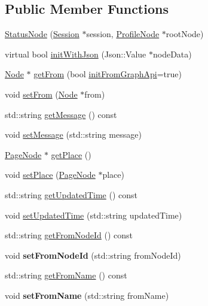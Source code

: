 \subsection*{Public Member Functions}
\begin{DoxyCompactItemize}
\item 
\hyperlink{classfl4cpp_1_1_status_node_ad0f19449b0dd5a4bf533f37b381cf540}{Status\+Node} (\hyperlink{classfl4cpp_1_1_session}{Session} $\ast$session, \hyperlink{classfl4cpp_1_1_profile_node}{Profile\+Node} $\ast$root\+Node)
\item 
virtual bool \hyperlink{classfl4cpp_1_1_status_node_aa99586c53782cfedd1f7d21e3508c20c}{init\+With\+Json} (Json\+::\+Value $\ast$node\+Data)
\item 
\hyperlink{classfl4cpp_1_1_node}{Node} $\ast$ \hyperlink{classfl4cpp_1_1_status_node_a5e7f1125af1dac536e4261e39c499171}{get\+From} (bool \hyperlink{classfl4cpp_1_1_node_a1dd4594ffd7eb08e9e8c5031d2109a59}{init\+From\+Graph\+Api}=true)
\item 
void \hyperlink{classfl4cpp_1_1_status_node_ae86c8eba3295e0dcd460310ff73f44e7}{set\+From} (\hyperlink{classfl4cpp_1_1_node}{Node} $\ast$from)
\item 
std\+::string \hyperlink{classfl4cpp_1_1_status_node_aac8ebbdf9a59455bacc180946ad25e06}{get\+Message} () const 
\item 
void \hyperlink{classfl4cpp_1_1_status_node_a7719a47fbc72b4fa26d88502e5e56f17}{set\+Message} (std\+::string message)
\item 
\hyperlink{classfl4cpp_1_1_page_node}{Page\+Node} $\ast$ \hyperlink{classfl4cpp_1_1_status_node_a634cb0b44f9303ac62630b9fb901eb59}{get\+Place} ()
\item 
void \hyperlink{classfl4cpp_1_1_status_node_a598d7291701df21efa48ddf71d603cbb}{set\+Place} (\hyperlink{classfl4cpp_1_1_page_node}{Page\+Node} $\ast$place)
\item 
std\+::string \hyperlink{classfl4cpp_1_1_status_node_a8f9656446c7ad2cee0be531dba3e7ab4}{get\+Updated\+Time} () const 
\item 
void \hyperlink{classfl4cpp_1_1_status_node_a6816c0cd53ae4cb334a7cb7e09bf2ddd}{set\+Updated\+Time} (std\+::string updated\+Time)
\item 
std\+::string \hyperlink{classfl4cpp_1_1_status_node_aa2569a3ee0d6040915c573da7ec9aac7}{get\+From\+Node\+Id} () const 
\item 
void {\bfseries set\+From\+Node\+Id} (std\+::string from\+Node\+Id)\hypertarget{classfl4cpp_1_1_status_node_a1d012a10abbaba819139441500b9a26d}{}\label{classfl4cpp_1_1_status_node_a1d012a10abbaba819139441500b9a26d}

\item 
std\+::string \hyperlink{classfl4cpp_1_1_status_node_a7835b71f23413116bc5ded5f0379bc0a}{get\+From\+Name} () const 
\item 
void {\bfseries set\+From\+Name} (std\+::string from\+Name)\hypertarget{classfl4cpp_1_1_status_node_a209d614aa476b85867d4745a816b86e0}{}\label{classfl4cpp_1_1_status_node_a209d614aa476b85867d4745a816b86e0}

\end{DoxyCompactItemize}
